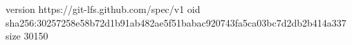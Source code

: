 version https://git-lfs.github.com/spec/v1
oid sha256:30257258e58b72d1b91ab482ae5f51babac920743fa5ca03bc7d2db2b414a337
size 30150
